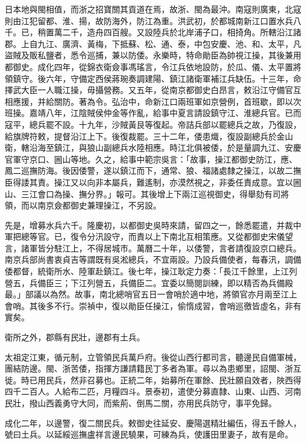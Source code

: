 日本地與閩相值，而浙之招寶關其貢道在焉，故浙、閩為最沖。南寇則廣東，北寇則由江犯留都、淮、揚，故防海外，防江為重。洪武初，於都城南新江口置水兵八千。已，稍置萬二千，造舟四百艘。又設陸兵於北岸浦子口，相掎角。所轄沿江諸郡。上自九江、廣濟、黃梅，下抵蘇、松、通、泰，中包安慶、池、和、太平，凡盜賊及販私鹽者，悉令巡捕，兼以防倭。永樂時，特命勛臣為帥視江操，其後兼用都御史。成化四年，從錦衣衛僉事馮瑤言，令江兵依地設防，於瓜、儀、太平置將領鎮守。後六年，守備定西侯蔣琬奏調建陽、鎮江諸衛軍補江兵缺伍。十三年，命擇武大臣一人職江操，毋攝營務。又五年，從南京都御史白昂言，敕沿江守備官互相應援，并給關防。著為令。弘治中，命新江口兩班軍如京營例，首班歇，即以次班操。嘉靖八年，江陰賊侯仲金等作亂，給事中夏言請設鎮守江、淮總兵官。已而寇平，總兵罷不設。十九年，沙賊黃艮等復起。帝詰兵部以罷總兵之故，乃復設，給旗牌符敕，提督沿江上下。後復裁罷。三十二年，倭患熾，復設副總兵於金山衛，轄沿海至鎮江，與狼山副總兵水陸相應。時江北俱被倭，於是量調九江、安慶官軍守京口、圌山等地。久之，給事中範宗吳言：「故事，操江都御史防江，應、鳳二巡撫防海。後因倭警，遂以鎮江而下，通常、狼、福諸處隸之操江，以故二撫臣得諉其責。操江又以向非本屬兵，難遙制，亦漠然視之，非委任責成意。宜以圌山、三江會口為操、撫分界。」報可。其後增上下兩江巡視御史，得舉劾有司將領，而以南京僉都御史兼理操江，不另設。

先是，增募水兵六千。隆慶初，以都御史吳時來請，留四之一，餘悉罷遣，并裁中軍把總等官。已，復令分汛設守，而責以上下南北互相策應。又從都御史宋儀望言，諸軍皆分駐江上，不得居城市。萬曆二十年，以倭警，言者請復設京口總兵。南京兵部尚書衷貞吉等謂既有吳淞總兵，不宜兩設。乃設兵備使者，每春汛，調備倭都督，統衛所水、陸軍赴鎮江。後七年，操江耿定力奏：「長江千餘里，上江列營五，兵備臣三；下江列營五，兵備臣二。宜委以簡閱訓練，即以精否為兵備殿最。」部議以為然。故事，南北總哨官五日一會哨於適中地，將領官亦月兩至江上會哨。其後多不行。崇禎中，復以勛臣任操江，偷惰成習，會哨巡徼皆虛名，非有實矣。

衛所之外，郡縣有民壯，邊郡有土兵。

太祖定江東，循元制，立管領民兵萬戶府。後從山西行都司言，聽邊民自備軍械，團結防邊。閩、浙苦倭，指揮方謙請籍民丁多者為軍。尋以為患鄉里，詔閩、浙互徙。時已用民兵，然非召募也。正統二年，始募所在軍餘、民壯願自效者，陜西得四千二百人。人給布二匹，月糧四斗。景泰初，遣使分募直隸、山東、山西、河南民壯，撥山西義勇守大同，而紫荊、倒馬二關，亦用民兵防守，事平免歸。

成化二年，以邊警，復二關民兵。敕御史往延安、慶陽選精壯編伍，得五千餘人，號曰土兵。以延綏巡撫盧祥言邊民驍果，可練為兵，使護田里妻子，故有是命。

